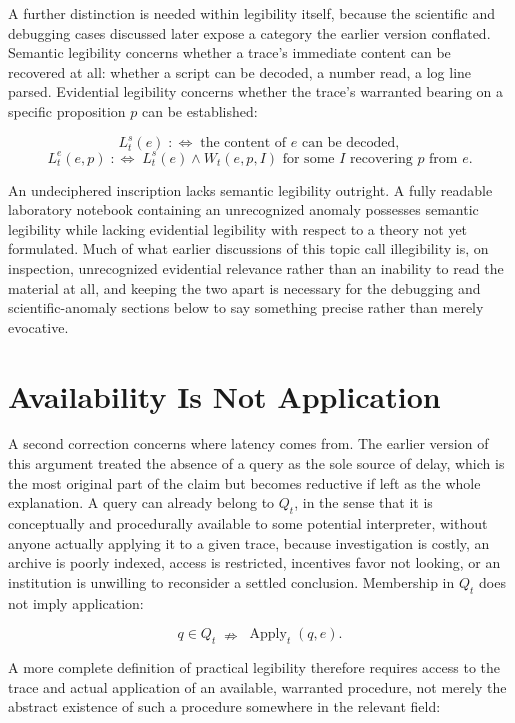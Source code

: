 \documentclass[11pt]{article}
\begin{document}
A further distinction is needed within legibility itself, because the scientific and debugging cases discussed later expose a category the earlier version conflated. Semantic legibility concerns whether a trace's immediate content can be recovered at all: whether a script can be decoded, a number read, a log line parsed. Evidential legibility concerns whether the trace's warranted bearing on a specific proposition $p$ can be established:

\[
L^s_t(e) \;:\Leftrightarrow\; \text{the content of } e \text{ can be decoded},
\]
\[
L^e_t(e,p) \;:\Leftrightarrow\; L^s_t(e) \land W_t(e,p,I) \text{ for some } I \text{ recovering } p \text{ from } e.
\]

An undeciphered inscription lacks semantic legibility outright. A fully readable laboratory notebook containing an unrecognized anomaly possesses semantic legibility while lacking evidential legibility with respect to a theory not yet formulated. Much of what earlier discussions of this topic call illegibility is, on inspection, unrecognized evidential relevance rather than an inability to read the material at all, and keeping the two apart is necessary for the debugging and scientific-anomaly sections below to say something precise rather than merely evocative.

\section{Availability Is Not Application}

A second correction concerns where latency comes from. The earlier version of this argument treated the absence of a query as the sole source of delay, which is the most original part of the claim but becomes reductive if left as the whole explanation. A query can already belong to $Q_t$, in the sense that it is conceptually and procedurally available to some potential interpreter, without anyone actually applying it to a given trace, because investigation is costly, an archive is poorly indexed, access is restricted, incentives favor not looking, or an institution is unwilling to reconsider a settled conclusion. Membership in $Q_t$ does not imply application:

\[
q \in Q_t \;\nRightarrow\; \operatorname{Apply}_t(q,e).
\]

A more complete definition of practical legibility therefore requires access to the trace and actual application of an available, warranted procedure, not merely the abstract existence of such a procedure somewhere in the relevant field:
\end{document}
